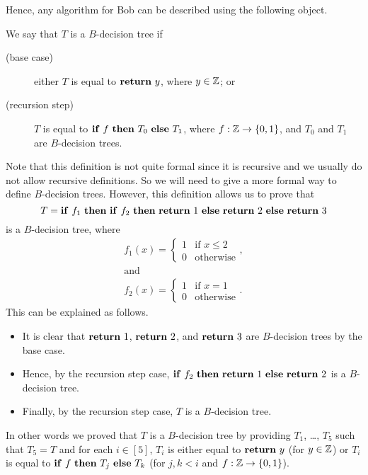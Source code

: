 Hence, any algorithm for Bob can be described using the following object.
\begin{definition}
  We say that $T$ is a $B$-decision tree if
  \begin{description}
    \item [(base case)] either $T$ is equal to $\mathbf{return}~{y}$, where $y \in {\mathbb{Z}}$;
      or
    \item [(recursion step)] $T$ is equal to $\mathbf{if}~{f}~\mathbf{then}~{T_0}~\mathbf{else}~{T_1}$,
      where $f : \Z \to \set{0, 1}$, and $T_0$ and $T_1$
      are $B$-decision trees.
  \end{description}
\end{definition}
Note that this definition is not quite formal since it is recursive and
we usually do not allow recursive definitions. So we will need to give a more
formal way to define $B$-decision trees. However, this definition allows us to
prove that 
\[
  T = 
  \mathbf{if}~{f_1}~\mathbf{then}~{
    \mathbf{if}~{f_2}~\mathbf{then}~{
      \mathbf{return}~{1}
     }~\mathbf{else}~{
      \mathbf{return}~{2}
     }
  }~\mathbf{else}~{
    \mathbf{return}~{3}
  }
\]
is a $B$-decision tree, where
\begin{gather*}
  f_1(x) =
    \begin{cases}
      1 & \text{if } x \le 2 \\
      0 & \text{otherwise}
    \end{cases}, \\
  \text{and} \\
  f_2(x) =
    \begin{cases}
      1 & \text{if } x = 1 \\
      0 & \text{otherwise}
    \end{cases}.
\end{gather*}
This can be explained as follows.
\begin{itemize}
  \item It is clear that $\mathbf{return}~{1}$, $\mathbf{return}~{2}$, and $\mathbf{return}~{3}$ are
    $B$-decision trees by the base case.
  \item Hence, by the recursion step case,
    $\mathbf{if}~{f_2}~\mathbf{then}~{\mathbf{return}~{1}}~\mathbf{else}~{\mathbf{return}~{2}}$ is a $B$-decision tree.
  \item Finally, by the recursion step case, $T$ is a $B$-decision tree.
\end{itemize}

In other words we proved that $T$ is a $B$-decision tree by providing $T_1$,
\dots, $T_5$ such that $T_5 = T$ and for each $i \in [5]$,
$T_i$ is either equal to $\mathbf{return}~{y}$ (for $y \in {\mathbb{Z}}$) or 
$T_i$ is equal to $\mathbf{if}~{f}~\mathbf{then}~{T_j}~\mathbf{else}~{T_k}$ (for $j, k < i$ and 
$f : \Z \to \set{0, 1}$).

